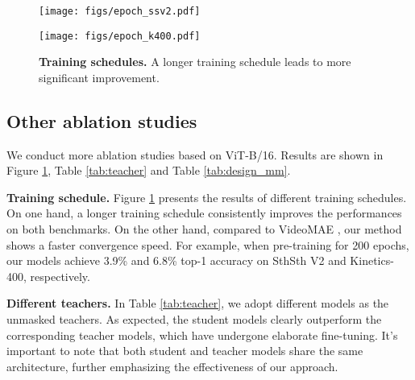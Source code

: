 \documentclass[10pt,twocolumn,letterpaper]{article}
\begin{document}
\begin{figure}[tp]
    \centering
    \begin{minipage}{\linewidth}
        \texttt{[image: figs/epoch\_ssv2.pdf]}
        \vspace{-0.7cm}
    \end{minipage}
    \vspace{-0.1cm}
    \begin{minipage}{\linewidth}
        \texttt{[image: figs/epoch\_k400.pdf]}
        \vspace{-0.7cm}
    \end{minipage}
\caption{
\textbf{Training schedules.} 
A longer training schedule leads to more significant improvement.
}
\label{fig:ablation_epoch}
\end{figure}



\subsection{Other ablation studies}
We conduct more ablation studies based on ViT-B/16.
Results are shown in Figure \ref{fig:ablation_epoch}, Table \ref{tab:teacher} and Table \ref{tab:design_mm}.

\textbf{Training schedule.}
Figure \ref{fig:ablation_epoch} presents the results of different training schedules.
On one hand,
a longer training schedule consistently improves the performances on both benchmarks.
On the other hand,
compared to VideoMAE \cite{videomae},
our method shows a faster convergence speed.
For example,
when pre-training for 200 epochs,
our models achieve 3.9\% and 6.8\% top-1 accuracy on SthSth V2 and Kinetics-400, respectively.


\textbf{Different teachers.}
In Table \ref{tab:teacher},
we adopt different models \cite{dino,clip,beitv2} as the unmasked teachers.
As expected, 
the student models clearly outperform the corresponding teacher models, 
which have undergone elaborate fine-tuning. 
It's important to note that both student and teacher models share the same architecture, 
further emphasizing the effectiveness of our approach.
\end{document}
